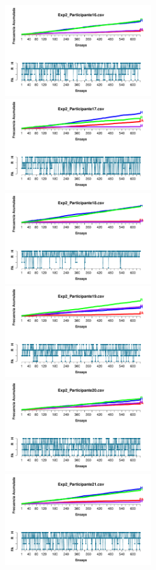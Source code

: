 \documentclass[a4paper ]{article}
\begin{document}
\begin{figure}[th]
\begin{center}
\includegraphics[width=8cm, height=4cm]{Figures/Outcome_Exp2_P16} \includegraphics[width=8cm, height=4cm]{Figures/Outcome_Exp2_P17} \includegraphics[width=8cm, height=4cm]{Figures/Outcome_Exp2_P18}
\includegraphics[width=8cm, height=4cm]{Figures/Outcome_Exp2_P19} \includegraphics[width=8cm, height=4cm]{Figures/Outcome_Exp2_P20} \includegraphics[width=8cm, height=4cm]{Figures/Outcome_Exp2_P21}
\end{center}
\end{figure}
\end{document}
